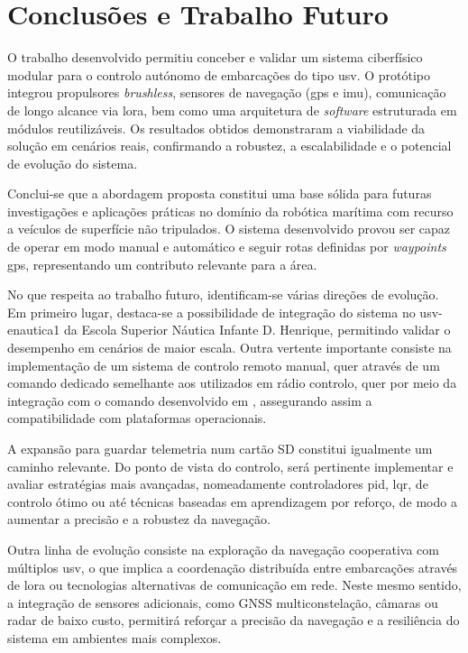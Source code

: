 \chapter{Conclusões e Trabalho Futuro}
\label{ch:conclusoesTrabalhoFuturo}

O trabalho desenvolvido permitiu conceber e validar um sistema ciberfísico modular para o controlo autónomo de embarcações do tipo \gls{usv}. O protótipo integrou propulsores \emph{brushless}, sensores de navegação (\gls{gps} e \gls{imu}), comunicação de longo alcance via \gls{lora}, bem como uma arquitetura de \emph{software} estruturada em módulos reutilizáveis. Os resultados obtidos demonstraram a viabilidade da solução em cenários reais, confirmando a robustez, a escalabilidade e o potencial de evolução do sistema.

Conclui-se que a abordagem proposta constitui uma base sólida para futuras investigações e aplicações práticas no domínio da robótica marítima com recurso a veículos de superfície não tripulados. O sistema desenvolvido provou ser capaz de operar em modo manual e automático e seguir rotas definidas por \emph{waypoints} \gls{gps}, representando um contributo relevante para a área.

No que respeita ao trabalho futuro, identificam-se várias direções de evolução. Em primeiro lugar, destaca-se a possibilidade de integração do sistema no \gls{usv}-enautica1 da Escola Superior Náutica Infante D. Henrique, permitindo validar o desempenho em cenários de maior escala. Outra vertente importante consiste na implementação de um sistema de controlo remoto manual, quer através de um comando dedicado semelhante aos utilizados em rádio controlo, quer por meio da integração com o comando desenvolvido em \cite{catamara-telecomandado}, assegurando assim a compatibilidade com plataformas operacionais. 

A expansão para guardar telemetria num cartão SD constitui igualmente um caminho relevante. Do ponto de vista do controlo, será pertinente implementar e avaliar estratégias mais avançadas, nomeadamente controladores \gls{pid}, \gls{lqr}, de controlo ótimo ou até técnicas baseadas em aprendizagem por reforço, de modo a aumentar a precisão e a robustez da navegação.

Outra linha de evolução consiste na exploração da navegação cooperativa com múltiplos \gls{usv}, o que implica a coordenação distribuída entre embarcações através de \gls{lora} ou tecnologias alternativas de comunicação em rede. Neste mesmo sentido, a integração de sensores adicionais, como GNSS multiconstelação, câmaras ou radar de baixo custo, permitirá reforçar a precisão da navegação e a resiliência do sistema em ambientes mais complexos.

